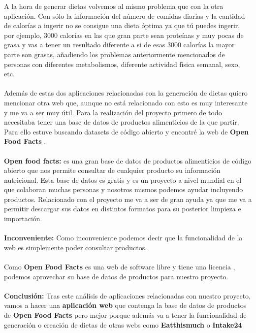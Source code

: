 A la hora de generar dietas volvemos al mismo problema que con la otra aplicación. Con sólo la información del número de comidas diarias y la cantidad de calorías a ingerir
no se consigue una dieta óptima ya que tú puedes ingerir, por ejemplo, 3000 calorías en las que gran parte sean proteínas y muy pocas de grasa y vas a tener un resultado diferente a si de 
esas 3000 calorías la mayor parte son grasas, añadiendo los problemas anteriormente mencionados de personas con diferentes metabolismos, diferente actividad física semanal, sexo, etc.
\\\\ 
Además de estas dos aplicaciones relacionadas con la generación de dietas quiero mencionar otra web que, aunque no está relacionado con esto es muy interesante y me va a ser muy útil.
Para la realización del proyecto primero de todo necesitaba tener una base de datos de productos alimenticios de la que partir. Para ello estuve buscando datasets de código abierto y encontré la web de \textbf{Open Food Facts} \cite{OpenFoodFacts}.
\\\\
\textbf{Open food facts:} es una gran base de datos de productos alimenticios de código abierto que nos permite consultar de cualquier producto su información nutricional.
Esta base de datos es gratis y es un proyecto a nivel mundial en el que colaboran muchas personas y nosotros mismos podemos ayudar incluyendo productos.
Relacionado con el proyecto me va a ser de gran ayuda ya que me va a permitir descargar sus datos en distintos formatos para su posterior limpieza e importación.
\\\\
\textbf{Inconveniente:}
Como inconveniente podemos decir que la funcionalidad de la web es simplemente poder consultar productos.
\\\\
Como \textbf{Open Food Facts} es una web de software libre y tiene una licencia \cite{Open-Database-License}, podemos aprovechar su base de datos de productos para nuestro proyecto.
\\\\
\textbf{Conclusión:}
Tras este análisis de aplicaciones relacionadas con nuestro proyecto, vamos a hacer una \textbf{aplicación web} que contenga la base de datos de productos de \textbf{Open Food Facts} pero mejor porque además va a tener
la funcionalidad de generación o creación de dietas de otras webs como \textbf{Eatthismuch} o \textbf{Intake24} 

